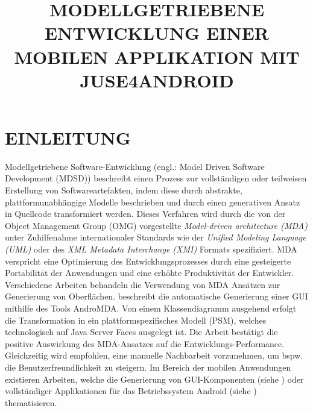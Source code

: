\documentclass[a4paper,twoside]{article}
\begin{document}
\title{\uppercase{Modellgetriebene Entwicklung einer mobilen Applikation mit JUSE4Android}}

\author{
}



\onecolumn \maketitle \normalsize \vfill
\section{\uppercase{Einleitung}}\label{sec:introduction}
\noindent Modellgetriebene Software-Entwicklung (engl.: Model Driven Software Development (MDSD))  beschreibt einen Prozess zur vollständigen oder teilweisen Erstellung von Softwareartefakten, indem diese durch abstrakte, plattformunabhängige Modelle beschrieben und durch einen generativen Ansatz in Quellcode transformiert werden. Dieses Verfahren wird durch die von der Object Management Group (OMG) vorgestellte \textit{Model-driven architecture (MDA)} unter Zuhilfenahme internationaler Standards wie der \textit{Unified Modeling Language (UML)} oder des \textit{XML Metadata Interchange (XMI)} Formats spezifiziert. MDA verspricht eine Optimierung des Entwicklungsprozesses durch eine gesteigerte Portabilität der Anwendungen und eine erhöhte Produktivität der Entwickler.\cite{OMG_MDA}\\
Verschiedene Arbeiten behandeln die Verwendung von MDA Ansätzen zur Generierung von Oberflächen. \cite{GUI_MDA} beschreibt die automatische Generierung einer GUI mithilfe des Tools AndroMDA. Von einem Klassendiagramm ausgehend erfolgt die Transformation in ein plattformspezifisches Modell (PSM), welches technologisch auf Java Server Faces ausgelegt ist. Die Arbeit bestätigt die positive Auswirkung des MDA-Ansatzes auf die Entwicklungs-Performance. Gleichzeitig wird empfohlen, eine manuelle Nachbarbeit vorzunehmen, um bspw. die Benutzerfreundlichkeit zu steigern.
Im Bereich der mobilen Anwendungen existieren Arbeiten, welche die Generierung von GUI-Komponenten (siehe \cite{GUI_MDA_Android}) oder vollständiger Applikationen für das Betriebssystem Android (siehe \cite{JUSE}) thematisieren. 
\end{document}

